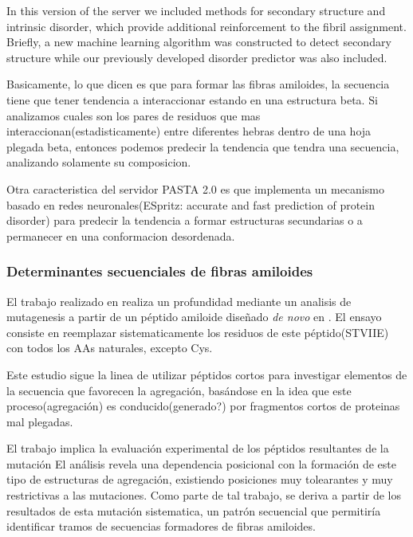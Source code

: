 In this version of the server we included methods for secondary structure and intrinsic disorder, which provide additional reinforcement to the fibril assignment. Briefly, a new machine learning algorithm was constructed to detect secondary structure while our previously developed disorder predictor was also included.


Basicamente, lo que dicen es que para formar las fibras amiloides, la secuencia tiene que tener tendencia a interaccionar estando en una estructura beta. Si analizamos cuales son los pares de residuos que mas interaccionan(estadisticamente) entre diferentes hebras dentro de una hoja plegada beta, entonces podemos predecir la tendencia que tendra una secuencia, analizando solamente su composicion.



Otra caracteristica del servidor PASTA 2.0 es que implementa un mecanismo basado en redes neuronales(ESpritz: accurate and fast prediction of protein disorder) para predecir la tendencia a formar estructuras secundarias o a permanecer en una conformacion desordenada. 








\subsubsection{Determinantes secuenciales de fibras amiloides}\label{determinantesSecuenciales}

El trabajo realizado en  \cite{de2004sequence} realiza un  profundidad mediante un analisis de mutagenesis a partir de un péptido amiloide diseñado \textit{de novo} en \cite{de2002novo}. 
El ensayo consiste en reemplazar sistematicamente los residuos de este péptido(STVIIE) con todos los AAs naturales, excepto Cys.

Este estudio sigue la linea de utilizar péptidos cortos para investigar elementos de la secuencia que favorecen la agregación, 
basándose en la idea que este proceso(agregación) es conducido(generado?) por fragmentos cortos de proteinas mal plegadas.

El trabajo implica la evaluación experimental de los péptidos resultantes de la mutación
El análisis revela una dependencia posicional con la formación de este tipo de estructuras de agregación, existiendo posiciones muy tolearantes y muy restrictivas a las mutaciones.
Como parte de tal trabajo, se deriva a partir de los resultados de esta mutación sistematica, un patrón secuencial que permitiría identificar tramos de secuencias formadores de fibras amiloides.

